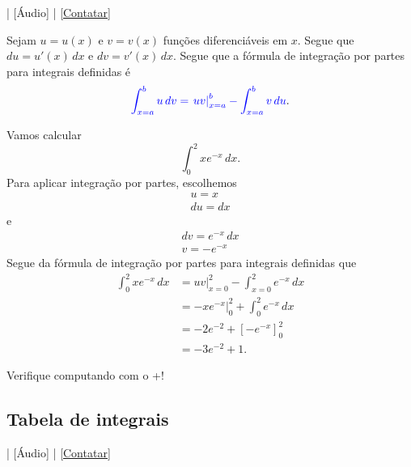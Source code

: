 \begin{flushright}
  [Vídeo] | [Áudio] | \href{https://phkonzen.github.io/notas/contato.html}{[Contatar]}
\end{flushright}

Sejam $u=u(x)$ e $v=v(x)$ funções diferenciáveis em $x$. Segue que $du = u'(x)\,dx$ e $dv = v'(x)\,dx$. Segue que a fórmula de integração por partes para integrais definidas é
\begin{equation}
  {\color{blue}\int_{x=a}^b u\,dv = \left. uv \right|_{x=a}^b - \int_{x=a}^b v\,du}.
\end{equation}

\begin{ex}
  Vamos calcular
  \begin{equation}
    \int_0^2 xe^{-x}\,dx.
  \end{equation}
  Para aplicar integração por partes, escolhemos
  \begin{gather}
    u = x\\
    du = dx
  \end{gather}
  e
  \begin{gather}
    dv = e^{-x}\,dx\\
    v = -e^{-x}
  \end{gather}
  Segue da fórmula de integração por partes para integrais definidas que
  \begin{align}
    \int_0^2 xe^{-x}\,dx &= \left. uv \right|_{x=0}^2 - \int_{x=0}^2 e^{-x}\,dx\\
                         &= \left. -xe^{-x}\right|_0^2 + \int_0^2 e^{-x}\,dx \\
                         &= -2e^{-2} + \left[-e^{-x}\right]_0^2 \\
                         &= -3e^{-2} + 1.
  \end{align}

  \ifispython
  Verifique computando com o {\python}+{\sympy}!
  \fi
\end{ex}

\subsection{Tabela de integrais}

\begin{flushright}
  [Vídeo] | [Áudio] | \href{https://phkonzen.github.io/notas/contato.html}{[Contatar]}
\end{flushright}

